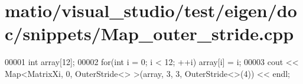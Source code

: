 \hypertarget{matio_2visual__studio_2test_2eigen_2doc_2snippets_2_map__outer__stride_8cpp_source}{}\section{matio/visual\+\_\+studio/test/eigen/doc/snippets/\+Map\+\_\+outer\+\_\+stride.cpp}
\label{matio_2visual__studio_2test_2eigen_2doc_2snippets_2_map__outer__stride_8cpp_source}

\begin{DoxyCode}
00001 \textcolor{keywordtype}{int} array[12];
00002 \textcolor{keywordflow}{for}(\textcolor{keywordtype}{int} i = 0; i < 12; ++i) array[i] = i;
00003 cout << Map<MatrixXi, 0, OuterStride<> >(array, 3, 3, OuterStride<>(4)) << endl;
\end{DoxyCode}

